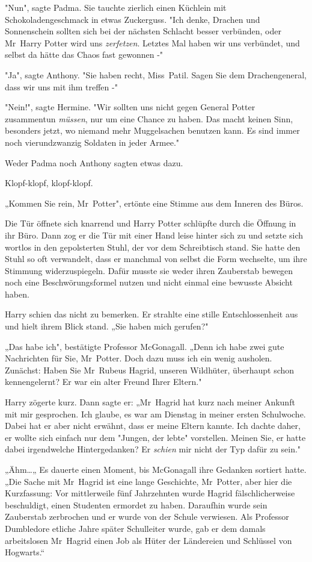{"Nun", sagte Padma. Sie tauchte zierlich einen Küchlein mit Schokoladengeschmack in etwas Zuckerguss. "Ich denke, Drachen und Sonnenschein sollten sich bei der nächsten Schlacht besser verbünden, oder Mr~Harry Potter wird uns \emph{zerfetzen}. Letztes Mal haben wir uns verbündet, und selbst da hätte das Chaos fast gewonnen -"

"Ja", sagte Anthony. "Sie haben recht, Miss~Patil. Sagen Sie dem Drachengeneral, dass wir uns mit ihm treffen -"

"Nein!", sagte Hermine. "Wir sollten uns nicht gegen General Potter zusammentun \emph{müssen}, nur um eine Chance zu haben. Das macht keinen Sinn, besonders jetzt, wo niemand mehr Muggelsachen benutzen kann. Es sind immer noch vierundzwanzig Soldaten in jeder Armee."

Weder Padma noch Anthony sagten etwas dazu.

Klopf-klopf, klopf-klopf.

„Kommen Sie rein, Mr~Potter", ertönte eine Stimme aus dem Inneren des Büros.

Die Tür öffnete sich knarrend und Harry Potter schlüpfte durch die Öffnung in ihr Büro. Dann zog er die Tür mit einer Hand leise hinter sich zu und setzte sich wortlos in den gepolsterten Stuhl, der vor dem Schreibtisch stand. Sie hatte den Stuhl so oft verwandelt, dass er manchmal von selbst die Form wechselte, um ihre Stimmung widerzuspiegeln. Dafür musste sie weder ihren Zauberstab bewegen noch eine Beschwörungsformel nutzen und nicht einmal eine bewusste Absicht haben.

Harry schien das nicht zu bemerken. Er strahlte eine stille Entschlossenheit aus und hielt ihrem Blick stand. „Sie haben mich gerufen?"

„Das habe ich", bestätigte Professor McGonagall. „Denn ich habe zwei gute Nachrichten für Sie, Mr~Potter. Doch dazu muss ich ein wenig ausholen. Zunächst: Haben Sie Mr~Rubeus Hagrid, unseren Wildhüter, überhaupt schon kennengelernt? Er war ein alter Freund Ihrer Eltern."

Harry zögerte kurz. Dann sagte er: „Mr~Hagrid hat kurz nach meiner Ankunft mit mir gesprochen. Ich glaube, es war am Dienstag in meiner ersten Schulwoche. Dabei hat er aber nicht erwähnt, dass er meine Eltern kannte. Ich dachte daher, er wollte sich einfach nur dem "Jungen, der lebte" vorstellen. Meinen Sie, er hatte dabei irgendwelche Hintergedanken? Er \emph{schien} mir nicht der Typ dafür zu sein."

„Ähm…„ Es dauerte einen Moment, bis McGonagall ihre Gedanken sortiert hatte. „Die Sache mit Mr~Hagrid ist eine lange Geschichte, Mr~Potter, aber hier die Kurzfassung: Vor mittlerweile fünf Jahrzehnten wurde Hagrid fälschlicherweise beschuldigt, einen Studenten ermordet zu haben. Daraufhin wurde sein Zauberstab zerbrochen und er wurde von der Schule verwiesen. Als Professor Dumbledore etliche Jahre später Schulleiter wurde, gab er dem damals arbeitslosen Mr~Hagrid einen Job als Hüter der Ländereien und Schlüssel von Hogwarts.“

}
